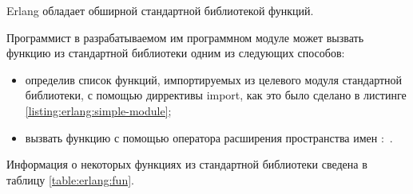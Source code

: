 
Erlang обладает обширной стандартной библиотекой функций.

Программист в разрабатываемом им программном модуле может вызвать функцию из стандартной библиотеки одним из следующих способов:

\begin{itemize}

	\item определив список функций, импортируемых из целевого модуля стандартной библиотеки, с помощью диррективы import, как это было сделано в листинге \ref{listing:erlang:simple-module};
	\item вызвать функцию с помощью оператора расширения пространства имен :~.

\end{itemize}

Информация о некоторых функциях из стандартной библиотеки сведена в таблицу \ref{table:erlang:fun}.

\newcommand{\elhead}[1]
{
	\multicolumn{6}{r}{Таблица~\thetable~---~Некоторые функции стандартной библиотеки~(#1)} \\
	\hline
	\multirow{2}{*}{\bf Функция} & \multicolumn{3}{c|}{\bf Параметры} & \multirow{2}{*}{\vbox{\centering \bf Возвращаемое \\ значение}} & \multirow{2}{*}{\bf Примечание} \\
	\cline{2-4}
	& \bf 1 & \bf 2 & \bf 3 && \\
	\hline
}

\newcommand{\elf}[6]{#1 & #2 & #3 & #4 & #5 & #6 \\}

